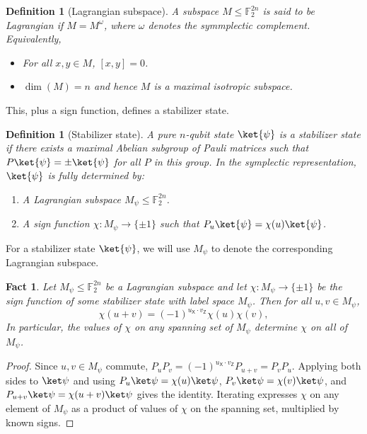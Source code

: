 \documentclass[11pt]{article}
\newtheorem{definition}[theorem]{Definition}
\newtheorem{fact}[theorem]{Fact}
\newcommand{\Z}{\mathsf{Z}}
\newcommand{\X}{\mathsf{X}}
\newcommand{\F}{\mathbb{F}}
\begin{document}
\begin{definition}[Lagrangian subspace]
A subspace $M \leq \F_2^{2n}$ is said to be Lagrangian if $M=M^\omega$, where $\omega$ denotes the symmplectic complement. Equivalently,
\begin{itemize}
    \item For all $x,y\in M$, $[x,y] = 0$.
    \item $\dim(M) = n$ and hence $M$ is a maximal isotropic subspace.
\end{itemize}
\end{definition}

This, plus a sign function, defines a stabilizer state.

\begin{definition}[Stabilizer state]
    A pure $n$-qubit state $\ket{\psi}$ is a stabilizer state if there exists a maximal Abelian subgroup of Pauli matrices such that $P\ket{\psi} = \pm\ket{\psi}$ for all $P$ in this group. In the symplectic representation, $\ket{\psi}$ is fully determined by:
    \begin{enumerate}
        \item A Lagrangian subspace $M_\psi \leq \F_2^{2n}$.
        \item A sign function $\chi: M_\psi \rightarrow \{\pm 1\}$ such that $P_u\ket{\psi} = \chi(u)\ket{\psi}$.
    \end{enumerate}
\end{definition}

For a stabilizer state $\ket{\psi}$, we will use $M_\psi$ to denote the corresponding Lagrangian subspace.
    
\begin{fact}
\label{fact:cocycle-extension}
Let $M_\psi \le\F_2^{2n}$ be a Lagrangian subspace and let $\chi:M_\psi \to\{\pm1\}$ be the
sign function of some stabilizer state with label space $M_\psi$.  Then for all
$u,v\in M_\psi$,
$$
    \chi(u+v)=(-1)^{u_\X \cdot v_\Z}\chi(u)\chi(v),
$$
In particular, the values of $\chi$ on any spanning set of $M_\psi$ determine $\chi$ on
all of $M_\psi$.
\end{fact}

\begin{proof}
Since $u,v\in M_\psi$ commute, $P_uP_v=(-1)^{u_\X \cdot v_\Z}P_{u+v}=P_vP_u$.  Applying
both sides to $\ket\psi$ and using $P_u\ket\psi=\chi(u)\ket\psi$,
$P_v\ket\psi=\chi(v)\ket\psi$, and
$P_{u+v}\ket\psi=\chi(u+v)\ket\psi$ gives the identity.  Iterating expresses
$\chi$ on any element of $M_\psi$ as a product of values of $\chi$ on the spanning
set, multiplied by known signs.
\end{proof}
\end{document}
